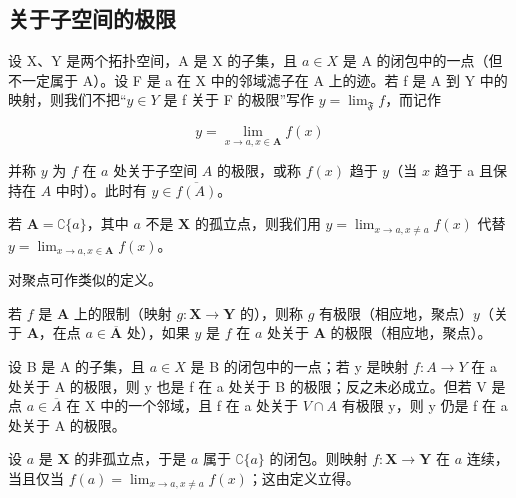 \subsection{关于子空间的极限}

设 X、Y 是两个拓扑空间，A 是 X 的子集，且 \(a \in X\) 是 A 的闭包中的一点（但不一定属于 A）。设 F 是 a 在 X 中的邻域滤子在 A 上的迹。若 f 是 A 到 Y 中的映射，则我们不把“\(y \in Y\) 是 f 关于 F 的极限”写作 \(y = \lim_{\mathfrak{F}} f\)，而记作

\[
y = \lim _ {x \to a, x \in \mathbf {A}} f (x)
\]

并称 \(y\) 为 \(f\) 在 \(a\) 处关于子空间 \(A\) 的极限，或称 \(f(x)\) 趋于 \(y\)（当 \(x\) 趋于 a 且保持在 \(A\) 中时）。此时有 \(y \in \overline{f(A)}\)。

若 \(\mathbf{A} = \complement\{a\}\)，其中 \(a\) 不是 \(\mathbf{X}\) 的孤立点，则我们用 \(y = \lim_{x\to a,x\neq a}f(x)\) 代替 \(y = \lim_{x\to a,x\in \mathbf{A}}f(x)\)。

对聚点可作类似的定义。

若 \(f\) 是 \(\mathbf{A}\) 上的限制（映射 \(g: \mathbf{X} \to \mathbf{Y}\) 的），则称 \(g\) 有极限（相应地，聚点）\(y\)（关于 \(\mathbf{A}\)，在点 \(a \in \overline{\mathbf{A}}\) 处），如果 \(y\) 是 \(f\) 在 \(a\) 处关于 \(\mathbf{A}\) 的极限（相应地，聚点）。

设 B 是 A 的子集，且 \(a \in X\) 是 B 的闭包中的一点；若 y 是映射 \(f: A \to Y\) 在 a 处关于 A 的极限，则 y 也是 f 在 a 处关于 B 的极限；反之未必成立。但若 V 是点 \(a \in \overline{A}\) 在 X 中的一个邻域，且 f 在 a 处关于 \(V \cap A\) 有极限 y，则 y 仍是 f 在 a 处关于 A 的极限。

设 \(a\) 是 \(\mathbf{X}\) 的非孤立点，于是 \(a\) 属于 \(\complement\{a\}\) 的闭包。则映射 \(f: \mathbf{X} \to \mathbf{Y}\) 在 \(a\) 连续，当且仅当 \(f(a) = \lim_{x \to a, x \neq a} f(x)\)；这由定义立得。

